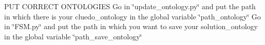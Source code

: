 P\+UT C\+O\+R\+R\+E\+CT O\+N\+T\+O\+L\+O\+G\+I\+ES Go in \char`\"{}update\+\_\+ontology.\+py\char`\"{} and put the path in which there is your cluedo\+\_\+ontology in the global variable \char`\"{}path\+\_\+ontology\char`\"{} Go in \char`\"{}\+F\+S\+M.\+py\char`\"{} and put the path in which you want to save your solution\+\_\+ontology in the global variable \char`\"{}path\+\_\+save\+\_\+ontology\char`\"{} 